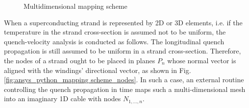 \begin{figure}[H]
\centering
{}
\caption{Multidimensional mapping scheme}
\label{fig:ansys_python_mapping scheme}
\end{figure}

When a superconducting strand is represented by 2D or 3D elements, i.e. if the temperature in the strand cross-section is assumed not to be uniform, the quench-velocity analysis is conducted as follows. The longitudinal quench propagation is still assumed to be uniform in a strand cross-section. Therefore, the nodes of a strand ought to be placed in planes $P_n$ whose normal vector is aligned with the windings' directional vector, as shown in Fig. \ref{fig:ansys_python_mapping scheme_nodes}. In such a case, an external routine controlling the quench propagation in time maps such a multi-dimensional mesh into an imaginary 1D cable with nodes $N_{1,...,n}$. 

